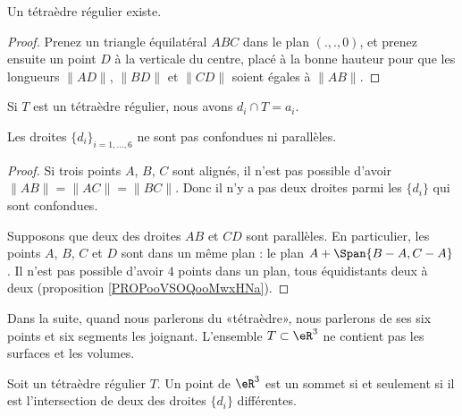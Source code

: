 \begin{lemma}
	Un tétraèdre régulier existe.
\end{lemma}

\begin{proof}
	Prenez un triangle équilatéral \( ABC\) dans le plan \( (.,.,0)\), et prenez ensuite un point \( D\) à la verticale du centre, placé à la bonne hauteur pour que les longueurs \( \| AD \|\), \( \| BD \|\) et \( \| CD \|\) soient égales à \( \| AB \|\).
\end{proof}

\begin{lemma}       \label{LEMooNWELooZeSEMN}
	Si \( T\) est un tétraèdre régulier, nous avons \( d_i\cap T=a_i\).
\end{lemma}

\begin{lemma}       \label{LEMooUSKVooQJiBuz}
	Les droites \( \{ d_i \}_{i=1,\ldots, 6}\) ne sont pas confondues ni parallèles.
\end{lemma}

\begin{proof}
	Si trois points \( A\), \( B\), \( C\) sont alignés, il n'est pas possible d'avoir \( \| AB \|=\| AC \|=\| BC \|\). Donc il n'y a pas deux droites parmi les \( \{ d_i \}\) qui sont confondues.

	Supposons que deux des droites \( AB\) et \( CD\) sont parallèles. En particulier, les points \( A\), \( B\), \( C\) et \( D\) sont dans un même plan : le plan \( A+\Span\{ B-A, C-A \}\). Il n'est pas possible d'avoir \( 4\) points dans un plan, tous équidistants deux à deux (proposition \ref{PROPooVSOQooMwxHNa}).
\end{proof}

Dans la suite, quand nous parlerons du «tétraèdre», nous parlerons de ses six points et six segments les joignant. L'ensemble \( T\subset \eR^3\) ne contient pas les surfaces et les volumes.

\begin{lemma}   \label{LEMooJCMKooOjMqtw}
	Soit un tétraèdre régulier \( T\). Un point de \( \eR^3\) est un sommet si et seulement si il est l'intersection de deux des droites \( \{ d_i \}\) différentes.
\end{lemma}

